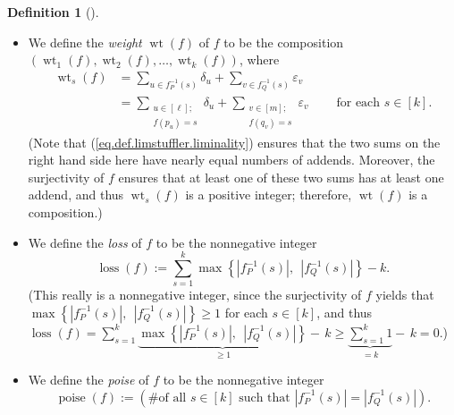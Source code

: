 \documentclass[numbers=enddot,12pt,final,onecolumn,notitlepage]{scrartcl}%
\theoremstyle{definition}
\newtheorem{defi}[theo]{Definition}
\newenvironment{definition}[1][]
{\begin{defi}[#1]\begin{leftbar}}
{\end{leftbar}\end{defi}}
\let\sumnonlimits\sum
\renewcommand{\sum}{\sumnonlimits\limits}
\begin{document}
\begin{definition}
\begin{itemize}
\item We define the \emph{weight} $\operatorname*{wt}\left(  f\right)  $ of
$f$ to be the composition $\left(  \operatorname*{wt}\nolimits_{1}\left(
f\right)  ,\operatorname*{wt}\nolimits_{2}\left(  f\right)  ,\ldots
,\operatorname*{wt}\nolimits_{k}\left(  f\right)  \right)  $, where%
\begin{align*}
\operatorname*{wt}\nolimits_{s}\left(  f\right)   &  =\sum_{u\in f_{P}%
^{-1}\left(  s\right)  }\delta_{u}+\sum_{v\in f_{Q}^{-1}\left(  s\right)
}\varepsilon_{v}\\
&  =\sum_{\substack{u\in\left[  \ell\right]  ;\\f\left(  p_{u}\right)
=s}}\delta_{u}+\sum_{\substack{v\in\left[  m\right]  ;\\f\left(  q_{v}\right)
=s}}\varepsilon_{v}\ \ \ \ \ \ \ \ \ \ \text{for each }s\in\left[  k\right]  .
\end{align*}
(Note that (\ref{eq.def.limstuffler.liminality}) ensures that the two sums on
the right hand side here have nearly equal numbers of addends. Moreover, the
surjectivity of $f$ ensures that at least one of these two sums has at least
one addend, and thus $\operatorname*{wt}\nolimits_{s}\left(  f\right)  $ is a
positive integer; therefore, $\operatorname*{wt}\left(  f\right)  $ is a composition.)

\item We define the \emph{loss} of $f$ to be the nonnegative integer%
\[
\operatorname*{loss}\left(  f\right)  :=\sum_{s=1}^{k}\max\left\{  \left\vert
f_{P}^{-1}\left(  s\right)  \right\vert ,\ \ \left\vert f_{Q}^{-1}\left(
s\right)  \right\vert \right\}  -k.
\]
(This really is a nonnegative integer, since the surjectivity of $f$ yields
that $\max\left\{  \left\vert f_{P}^{-1}\left(  s\right)  \right\vert
,\ \ \left\vert f_{Q}^{-1}\left(  s\right)  \right\vert \right\}  \geq1$ for
each $s\in\left[  k\right]  $, and thus $\operatorname*{loss}\left(  f\right)
=\sum_{s=1}^{k}\underbrace{\max\left\{  \left\vert f_{P}^{-1}\left(  s\right)
\right\vert ,\ \ \left\vert f_{Q}^{-1}\left(  s\right)  \right\vert \right\}
}_{\geq1}-\,k\geq\underbrace{\sum_{s=1}^{k}1}_{=k}-\,k=0$.)

\item We define the \emph{poise} of $f$ to be the nonnegative integer%
\[
\operatorname*{poise}\left(  f\right)  :=\left(  \text{\# of all }s\in\left[
k\right]  \text{ such that }\left\vert f_{P}^{-1}\left(  s\right)  \right\vert
=\left\vert f_{Q}^{-1}\left(  s\right)  \right\vert \right)  .
\]

\end{itemize}
\end{definition}
\end{document}

